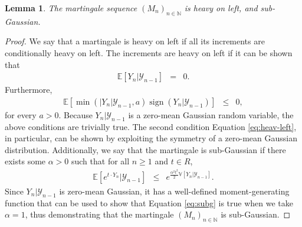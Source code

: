 \documentclass[]{article}
\DeclareMathOperator{\sign}{sign}
\newcommand{\brac}[1]{\left[{#1}\right]}
\newcommand{\E}[1]{\mathbb{E}\brac{{#1}}}
\newcommand{\V}[1]{\mathbb{V}\brac{{#1}}}
\newcommand{\1}{\mathbf{1}}
\newcommand{\0}{\mathbf{0}}
\newtheorem{lemma}[theorem]{Lemma}
\begin{document}
\begin{lemma}
  	The martingale sequence $(M_n)_{n \in \mathbb{N}}$ is heavy on left, and sub-Gaussian.
\end{lemma}
\begin{proof}
  	We say that a martingale is heavy on left if all its increments are conditionally heavy on left. The increments are heavy on left if it can be shown that
  	\begin{eqnarray}
    	\E{Y_n | \mathcal{Y}_{n-1}} &=& 0.
  	\end{eqnarray}
  	Furthermore,
  	\begin{eqnarray}
    	\E{\min(|Y_n | \mathcal{Y}_{n-1}, a)\sign(Y_n | \mathcal{Y}_{n-1})} &\leq& 0 \label{eq:heav-left}, 
  	\end{eqnarray}
  	for every $a > 0$. Because $Y_n | \mathcal{Y}_{n-1}$ is a zero-mean Gaussian random variable, the above conditions are trivially true. The second condition Equation \ref{eq:heav-left}, in particular, can be shown by exploiting the symmetry of a zero-mean Gaussian distribution. Additionally, we say that the martingale is sub-Gaussian if there exists some $\alpha > 0$ such that for all $n \geq 1$ and $t \in {R}$,
  	\begin{eqnarray}
    	\E{e^{t\cdot Y_n} | \mathcal{Y}_{n-1}} &\leq& e^{\frac{\alpha^2 t^2}{2} \V{Y_n| \mathcal{Y}_{n-1}}}. \label{eq:subg}
  	\end{eqnarray}
  	Since $Y_n | \mathcal{Y}_{n-1}$ is zero-mean Gaussian, it has a well-defined moment-generating function that can be used to show that Equation \ref{eq:subg} is true when we take $\alpha =1$, thus demonstrating that the martingale $(M_n)_{n \in \mathbb{N}}$ is sub-Gaussian.
\end{proof}
\end{document}
